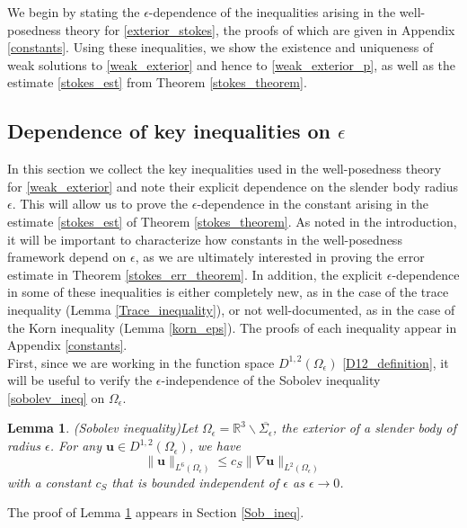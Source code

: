 \documentclass[11pt]{article}
\numberwithin{equation}{section}
\newcommand{\R}{\mathbb{R}}
\newcommand{\bu}{\bm{u}}
\newtheorem{lemma}[theorem]{Lemma}
\theoremstyle{definition}
\begin{document}
We begin by stating the $\epsilon$-dependence of the inequalities arising in the well-posedness theory for \eqref{exterior_stokes}, the proofs of which are given in Appendix \ref{constants}. Using these inequalities, we show the existence and uniqueness of weak solutions to \eqref{weak_exterior} and hence to \eqref{weak_exterior_p}, as well as the estimate \eqref{stokes_est} from Theorem \ref{stokes_theorem}. 

\subsection{Dependence of key inequalities on $\epsilon$}\label{constants0}
In this section we collect the key inequalities used in the well-posedness theory for \eqref{weak_exterior} and note their explicit dependence on the slender body radius $\epsilon$. This will allow us to prove the $\epsilon$-dependence in the constant arising in the estimate \eqref{stokes_est} of Theorem \ref{stokes_theorem}. As noted in the introduction, it will be important to characterize how constants in the well-posedness framework depend on $\epsilon$, as we are ultimately interested in proving the error estimate in Theorem \ref{stokes_err_theorem}. In addition, the explicit $\epsilon$-dependence in some of these inequalities is either completely new, as in the case of the trace inequality (Lemma \ref{Trace_inequality}), or not well-documented, as in the case of the Korn inequality (Lemma \ref{korn_eps}). The proofs of each inequality appear in Appendix \ref{constants}. \\

First, since we are working in the function space $D^{1,2}(\Omega_\epsilon)$ \eqref{D12_definition}, it will be useful to verify the $\epsilon$-independence of the Sobolev inequality \eqref{sobolev_ineq} on $\Omega_\epsilon$. 
 \begin{lemma}\emph{(Sobolev inequality)}\label{sobo_ineq}
Let $\Omega_{\epsilon}=\R^3\backslash\overline{\Sigma_{\epsilon}}$, the exterior of a slender body of radius $\epsilon$. For any $\bu\in D^{1,2}(\Omega_{\epsilon})$, we have
\begin{equation}\label{sobolev_const}
\| \bu\|_{L^6(\Omega_{\epsilon})} \le c_S\|\nabla\bu\|_{L^2(\Omega_{\epsilon})}
\end{equation}
with a constant $c_S$ that is bounded independent of $\epsilon$ as $\epsilon\to 0$. 
\end{lemma}
The proof of Lemma \ref{sobo_ineq} appears in Section \ref{Sob_ineq}. \\
\end{document}
